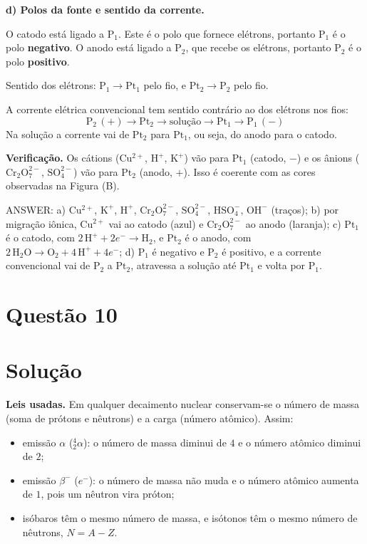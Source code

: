 \documentclass{article}%
\begin{document}
\medskip
\textbf{d) Polos da fonte e sentido da corrente.}

O catodo está ligado a $\mathrm{P_1}$. Este é o polo que fornece elétrons, portanto $\mathrm{P_1}$ é o polo \textbf{negativo}. O anodo está ligado a $\mathrm{P_2}$, que recebe os elétrons, portanto $\mathrm{P_2}$ é o polo \textbf{positivo}.

Sentido dos elétrons: $\mathrm{P_1}\to\mathrm{Pt_1}$ pelo fio, e $\mathrm{Pt_2}\to\mathrm{P_2}$ pelo fio.

A corrente elétrica convencional tem sentido contrário ao dos elétrons nos fios:
\[
\mathrm{P_2\,(+)}\to \mathrm{Pt_2}\to\text{solução}\to\mathrm{Pt_1}\to \mathrm{P_1\,(-)}
\]
Na solução a corrente vai de $\mathrm{Pt_2}$ para $\mathrm{Pt_1}$, ou seja, do anodo para o catodo.

\textbf{Verificação.} Os cátions ($\mathrm{Cu^{2+}}$, $\mathrm{H^+}$, $\mathrm{K^+}$) vão para $\mathrm{Pt_1}$ (catodo, $-$) e os ânions ($\mathrm{Cr_2O_7^{2-}}$, $\mathrm{SO_4^{2-}}$) vão para $\mathrm{Pt_2}$ (anodo, $+$). Isso é coerente com as cores observadas na Figura (B).

\medskip
ANSWER: a) $\mathrm{Cu^{2+}}$, $\mathrm{K^+}$, $\mathrm{H^+}$, $\mathrm{Cr_2O_7^{2-}}$, $\mathrm{SO_4^{2-}}$, $\mathrm{HSO_4^-}$, $\mathrm{OH^-}$ (traços); b) por migração iônica, $\mathrm{Cu^{2+}}$ vai ao catodo (azul) e $\mathrm{Cr_2O_7^{2-}}$ ao anodo (laranja); c) $\mathrm{Pt_1}$ é o catodo, com $2\,\mathrm{H^+}+2e^-\to \mathrm{H_2}$, e $\mathrm{Pt_2}$ é o anodo, com $2\,\mathrm{H_2O}\to \mathrm{O_2}+4\,\mathrm{H^+}+4e^-$; d) $\mathrm{P_1}$ é negativo e $\mathrm{P_2}$ é positivo, e a corrente convencional vai de $\mathrm{P_2}$ a $\mathrm{Pt_2}$, atravessa a solução até $\mathrm{Pt_1}$ e volta por $\mathrm{P_1}$.%
\newpage%
\section*{Questão 10}

\section*{Solução}

\textbf{Leis usadas.} Em qualquer decaimento nuclear conservam-se o número de massa (soma de prótons e nêutrons) e a carga (número atômico). Assim:
\begin{itemize}
\item emissão $\alpha$ ($^{4}_{2}\alpha$): o número de massa diminui de $4$ e o número atômico diminui de $2$;
\item emissão $\beta^-$ ($e^-$): o número de massa não muda e o número atômico aumenta de $1$, pois um nêutron vira próton;
\item isóbaros têm o mesmo número de massa, e isótonos têm o mesmo número de nêutrons, $N = A - Z$.
\end{itemize}
\end{document}
